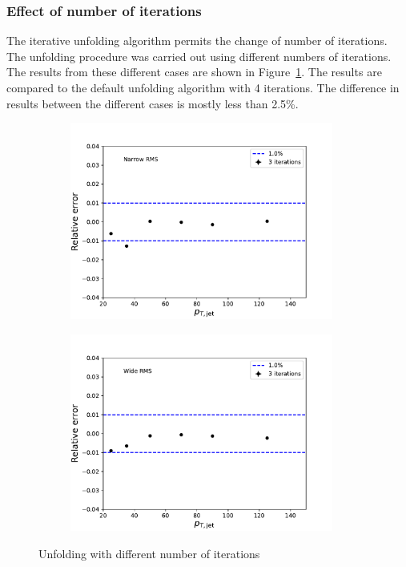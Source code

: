 \subsubsection{Effect of number of iterations}
\label{}
The iterative unfolding algorithm permits the change of number of iterations. The unfolding procedure was carried out using different numbers of iterations. The results from these different cases are shown in Figure~\ref{fig:iterations}. The results are compared to the default unfolding algorithm with 4 iterations. The difference in results between the different cases is mostly less than 2.5\%.
\begin{figure}
\centering
\begin{subfigure}{0.44\textwidth}
\includegraphics[width=0.95\textwidth]{figures/systematics/SystematicErrorsGausRMS_iterations.pdf}
\end{subfigure}
\begin{subfigure}{0.44\textwidth}
\includegraphics[width=0.95\textwidth]{figures/systematics/SystematicErrorsGammaRMS_iterations.pdf}
\end{subfigure}
\caption{Unfolding with different number of iterations}
\label{fig:iterations}
\end{figure}

